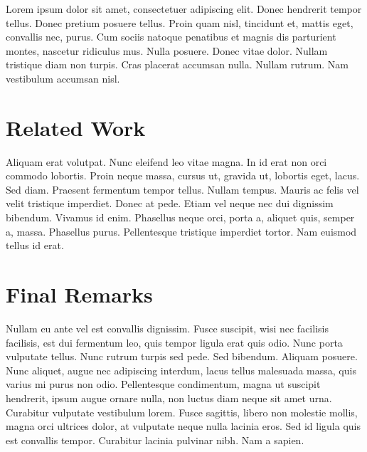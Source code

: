 \documentclass[conference, fleqn]{IEEEtran}
\begin{document}
Lorem ipsum dolor sit amet, consectetuer adipiscing elit. Donec hendrerit tempor
tellus. Donec pretium posuere tellus. Proin quam nisl, tincidunt et, mattis
eget, convallis nec, purus. Cum sociis natoque penatibus et magnis dis
parturient montes, nascetur ridiculus mus. Nulla posuere. Donec vitae dolor.
Nullam tristique diam non turpis. Cras placerat accumsan nulla. Nullam rutrum.
Nam vestibulum accumsan nisl.
\section{Related Work}

Aliquam erat volutpat. Nunc eleifend leo vitae magna. In id erat non orci
commodo lobortis. Proin neque massa, cursus ut, gravida ut, lobortis eget,
lacus. Sed diam. Praesent fermentum tempor tellus. Nullam tempus. Mauris ac
felis vel velit tristique imperdiet. Donec at pede. Etiam vel neque nec dui
dignissim bibendum. Vivamus id enim. Phasellus neque orci, porta a, aliquet
quis, semper a, massa. Phasellus purus. Pellentesque tristique imperdiet tortor.
Nam euismod tellus id erat.
\section{Final Remarks}

Nullam eu ante vel est convallis dignissim. Fusce suscipit, wisi nec facilisis
facilisis, est dui fermentum leo, quis tempor ligula erat quis odio. Nunc porta
vulputate tellus. Nunc rutrum turpis sed pede. Sed bibendum. Aliquam posuere.
Nunc aliquet, augue nec adipiscing interdum, lacus tellus malesuada massa, quis
varius mi purus non odio. Pellentesque condimentum, magna ut suscipit hendrerit,
ipsum augue ornare nulla, non luctus diam neque sit amet urna. Curabitur
vulputate vestibulum lorem. Fusce sagittis, libero non molestie mollis, magna
orci ultrices dolor, at vulputate neque nulla lacinia eros. Sed id ligula quis
est convallis tempor. Curabitur lacinia pulvinar nibh. Nam a sapien.



\end{document}
